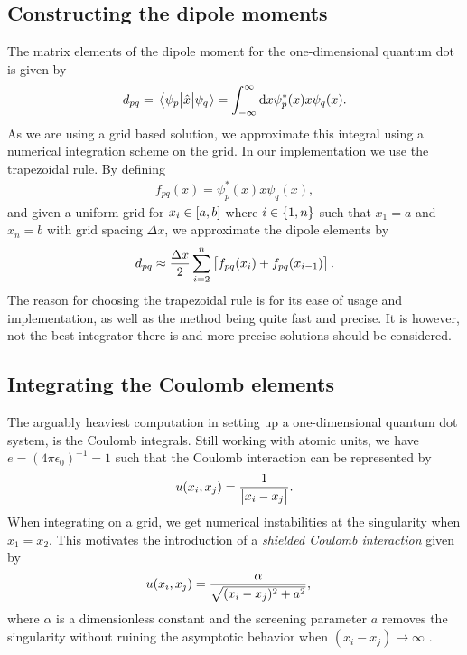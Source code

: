     \subsection{Constructing the dipole moments}
        The matrix elements of the dipole moment for the one-dimensional quantum
        dot is given by
        \begin{align}
            d_{pq}
            = \mel{\psi_{p}}{\hat{x}}{\psi_{q}}
            = \int_{-\infty}^{\infty}\dd x
            \psi^{*}_{p}(x) x \psi_{q}(x).
        \end{align}
        As we are using a grid based solution, we approximate this integral
        using a numerical integration scheme on the grid.
        In our implementation we use the trapezoidal rule.
        By defining
        \begin{align}
            f_{pq}(x) = \psi^{*}_{p}(x) x \psi_{q}(x),
        \end{align}
        and given a uniform grid for $x_i \in \left[ a, b \right]$ where $i \in \left\{ 1,
        n \right\}$ such that $x_1 = a$ and $x_n = b$ with grid spacing $\Delta x$, we
        approximate the dipole elements by
        \begin{align}
            d_{pq}
            \approx
            \frac{\Delta x}{2}\sum_{i = 2}^{n}\left[ 
                f_{pq}(x_{i}) + f_{pq}(x_{i - 1})
             \right].
        \end{align}
        The reason for choosing the trapezoidal rule is for its ease of usage
        and implementation, as well as the method being quite fast and precise.
        It is however, not the best integrator there is and more precise
        solutions should be considered.


    \subsection{Integrating the Coulomb elements}
        The arguably heaviest computation in setting up a one-dimensional
        quantum dot system, is the Coulomb integrals.
        Still working with atomic units, we have $e = (4\pi \epsilon_0)^{-1} =
        1$ such that the Coulomb interaction can be represented by
        \begin{align}
            u(x_i, x_j) = \frac{1}{\abs{x_i - x_j}}.
        \end{align}
        When integrating on a grid, we get numerical instabilities at the
        singularity when $x_1 = x_2$.
        This motivates the introduction of a \emph{shielded Coulomb interaction}
        \cite{suq, skattum2013time, kristiansen2017time} given by
        \begin{align}
            u(x_i, x_j)
            &= \frac{\alpha}{\sqrt{(x_i - x_j)^2 + a^2}},
            \label{eq:shielded-coulomb}
        \end{align}
        where $\alpha$ is a dimensionless constant and the screening parameter
        $a$ removes the singularity without ruining the asymptotic behavior
        when $(x_i - x_j) \to \infty$ \cite{suq, kristiansen2017time}.

